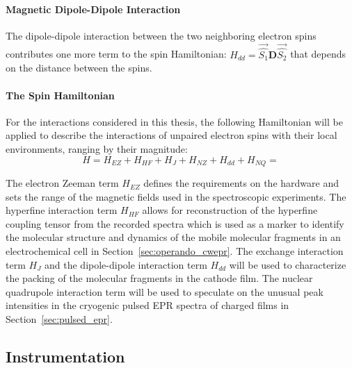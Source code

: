 \paragraph*{Magnetic Dipole-Dipole Interaction}
The dipole-dipole interaction between the two neighboring electron spins contributes one more term to the spin Hamiltonian: $H_{dd} = \vec{\hat{S_1}}\textbf{D}\vec{\hat{S_2}}$ that depends on the distance between the spins. 

\paragraph*{The Spin Hamiltonian}
For the interactions considered in this thesis, the following Hamiltonian will be applied to describe the interactions of unpaired electron spins with their local environments, ranging by their magnitude:
\begin{equation}
H = H_{EZ} + H_{HF} + H_{J} + H_{NZ} + H_{dd} + H_{NQ} =
\end{equation}

The electron Zeeman term $H_{EZ}$ defines the requirements on the hardware and sets the range of the magnetic fields used in the spectroscopic experiments. The hyperfine interaction term $H_{HF}$ allows for reconstruction of the hyperfine coupling tensor from the recorded spectra which is used as a marker to identify the molecular structure and dynamics of the mobile molecular fragments in an electrochemical cell in Section~\ref{sec:operando_cwepr}. The exchange interaction term $H_{J}$ and the dipole-dipole interaction term $H_{dd}$ will be used to characterize the packing of the molecular fragments in the cathode film. The nuclear quadrupole interaction term will be used to speculate on the unusual peak intensities in the cryogenic pulsed EPR spectra of charged films in Section~\ref{sec:pulsed_epr}.


\subsection{Instrumentation}
